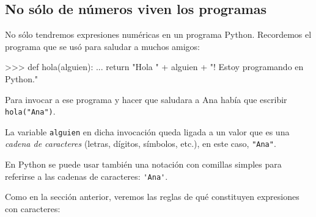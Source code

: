 
\subsection{No sólo de números viven los programas} \label{nosolo}

No sólo tendremos expresiones numéricas en un programa Python.
Recordemos el programa que se usó para saludar a muchos amigos:

\begin{codigo-python-sn}
>>> def hola(alguien):
...     return "Hola " + alguien + "! Estoy programando en Python."
\end{codigo-python-sn}

Para invocar a ese programa y hacer que saludara a Ana había que
escribir \lstinline!hola("Ana")!.

La variable \lstinline!alguien! en dicha invocación queda ligada a un
valor que es una \emph{cadena de caracteres} (letras, dígitos, símbolos,
etc.), en este caso, \lstinline!"Ana"!.

En Python se puede usar también una notación con comillas simples para
referirse a las cadenas de caracteres: \lstinline!'Ana'!.

Como en la sección anterior, veremos las reglas de qué constituyen
expresiones con caracteres:

